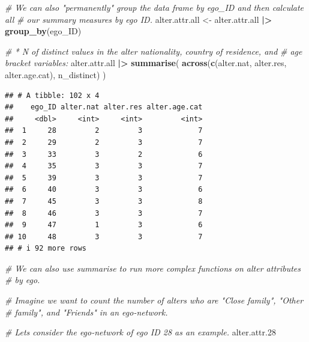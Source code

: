 \documentclass[
]{book}
\newenvironment{Shaded}{\begin{snugshade}}{\end{snugshade}}
\newcommand{\CommentTok}[1]{\textcolor[rgb]{0.56,0.35,0.01}{\textit{#1}}}
\newcommand{\FloatTok}[1]{\textcolor[rgb]{0.00,0.00,0.81}{#1}}
\newcommand{\FunctionTok}[1]{\textcolor[rgb]{0.13,0.29,0.53}{\textbf{#1}}}
\newcommand{\NormalTok}[1]{#1}
\newcommand{\OtherTok}[1]{\textcolor[rgb]{0.56,0.35,0.01}{#1}}
\newcommand{\SpecialCharTok}[1]{\textcolor[rgb]{0.81,0.36,0.00}{\textbf{#1}}}
\begin{document}
\begin{Shaded}
\begin{Highlighting}[]
\CommentTok{\# We can also "permanently" group the data frame by ego\_ID and then calculate all}
\CommentTok{\# our summary measures by ego ID.}
\NormalTok{alter.attr.all }\OtherTok{\textless{}{-}}\NormalTok{ alter.attr.all }\SpecialCharTok{|\textgreater{}} 
  \FunctionTok{group\_by}\NormalTok{(ego\_ID)}

\CommentTok{\# * N of distinct values in the alter nationality, country of residence, and}
\CommentTok{\# age bracket variables:}
\NormalTok{alter.attr.all }\SpecialCharTok{|\textgreater{}}
  \FunctionTok{summarise}\NormalTok{(}
    \FunctionTok{across}\NormalTok{(}\FunctionTok{c}\NormalTok{(alter.nat, alter.res, alter.age.cat), }
\NormalTok{           n\_distinct)}
\NormalTok{    )}
\end{Highlighting}
\end{Shaded}

\begin{verbatim}
## # A tibble: 102 x 4
##    ego_ID alter.nat alter.res alter.age.cat
##     <dbl>     <int>     <int>         <int>
##  1     28         2         3             7
##  2     29         2         3             7
##  3     33         3         2             6
##  4     35         3         3             7
##  5     39         3         3             7
##  6     40         3         3             6
##  7     45         3         3             8
##  8     46         3         3             7
##  9     47         1         3             6
## 10     48         3         3             7
## # i 92 more rows
\end{verbatim}

\begin{Shaded}
\begin{Highlighting}[]
\CommentTok{\# We can also use summarise to run more complex functions on alter attributes}
\CommentTok{\# by ego.}

\CommentTok{\# Imagine we want to count the number of alters who are "Close family", "Other}
\CommentTok{\# family", and "Friends" in an ego{-}network.}

\CommentTok{\# Let\textquotesingle{}s consider the ego{-}network of ego ID 28 as an example.}
\NormalTok{alter.attr}\FloatTok{.28}
\end{Highlighting}
\end{Shaded}
\end{document}
